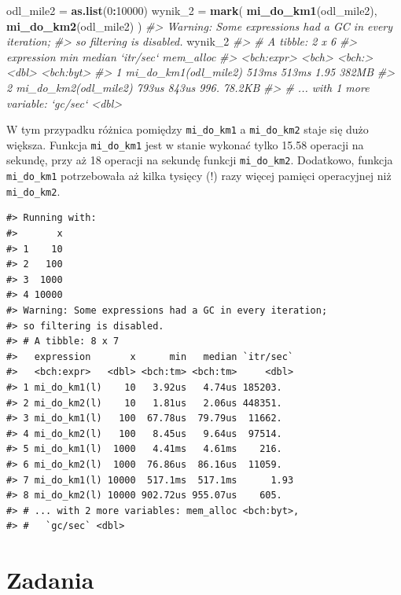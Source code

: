 \documentclass[paper=6in:9in,pagesize=pdftex,headinclude=on,footinclude=on,10pt]{scrbook}
\newenvironment{Shaded}{\begin{snugshade}}{\end{snugshade}}
\newcommand{\CommentTok}[1]{\textcolor[rgb]{0.56,0.35,0.01}{\textit{#1}}}
\newcommand{\DecValTok}[1]{\textcolor[rgb]{0.00,0.00,0.81}{#1}}
\newcommand{\KeywordTok}[1]{\textcolor[rgb]{0.13,0.29,0.53}{\textbf{#1}}}
\newcommand{\NormalTok}[1]{#1}
\newcommand{\OperatorTok}[1]{\textcolor[rgb]{0.81,0.36,0.00}{\textbf{#1}}}
\newcommand{\StringTok}[1]{\textcolor[rgb]{0.31,0.60,0.02}{#1}}
\begin{document}
\begin{Shaded}
\begin{Highlighting}[]
\NormalTok{odl_mile2 =}\StringTok{ }\KeywordTok{as.list}\NormalTok{(}\DecValTok{0}\OperatorTok{:}\DecValTok{10000}\NormalTok{)}
\NormalTok{wynik_}\DecValTok{2}\NormalTok{ =}\StringTok{ }\KeywordTok{mark}\NormalTok{(}
  \KeywordTok{mi_do_km1}\NormalTok{(odl_mile2),}
  \KeywordTok{mi_do_km2}\NormalTok{(odl_mile2)}
\NormalTok{)}
\CommentTok{#> Warning: Some expressions had a GC in every iteration;}
\CommentTok{#> so filtering is disabled.}
\NormalTok{wynik_}\DecValTok{2}
\CommentTok{#> # A tibble: 2 x 6}
\CommentTok{#>   expression             min median `itr/sec` mem_alloc}
\CommentTok{#>   <bch:expr>           <bch> <bch:>     <dbl> <bch:byt>}
\CommentTok{#> 1 mi_do_km1(odl_mile2) 513ms  513ms      1.95     382MB}
\CommentTok{#> 2 mi_do_km2(odl_mile2) 793us  843us    996.      78.2KB}
\CommentTok{#> # ... with 1 more variable: `gc/sec` <dbl>}
\end{Highlighting}
\end{Shaded}

W tym przypadku różnica pomiędzy \texttt{mi\_do\_km1} a \texttt{mi\_do\_km2} staje się dużo większa.
Funkcja \texttt{mi\_do\_km1} jest w stanie wykonać tylko 15.58 operacji na sekundę, przy aż 18 operacji na sekundę funkcji \texttt{mi\_do\_km2}.
Dodatkowo, funkcja \texttt{mi\_do\_km1} potrzebowała aż kilka tysięcy (!) razy więcej pamięci operacyjnej niż \texttt{mi\_do\_km2}.

\begin{verbatim}
#> Running with:
#>       x
#> 1    10
#> 2   100
#> 3  1000
#> 4 10000
#> Warning: Some expressions had a GC in every iteration;
#> so filtering is disabled.
#> # A tibble: 8 x 7
#>   expression       x      min   median `itr/sec`
#>   <bch:expr>   <dbl> <bch:tm> <bch:tm>     <dbl>
#> 1 mi_do_km1(l)    10   3.92us   4.74us 185203.  
#> 2 mi_do_km2(l)    10   1.81us   2.06us 448351.  
#> 3 mi_do_km1(l)   100  67.78us  79.79us  11662.  
#> 4 mi_do_km2(l)   100   8.45us   9.64us  97514.  
#> 5 mi_do_km1(l)  1000   4.41ms   4.61ms    216.  
#> 6 mi_do_km2(l)  1000  76.86us  86.16us  11059.  
#> 7 mi_do_km1(l) 10000  517.1ms  517.1ms      1.93
#> 8 mi_do_km2(l) 10000 902.72us 955.07us    605.  
#> # ... with 2 more variables: mem_alloc <bch:byt>,
#> #   `gc/sec` <dbl>
\end{verbatim}

\hypertarget{zadania-10}{%
\section{Zadania}\label{zadania-10}}
\end{document}
